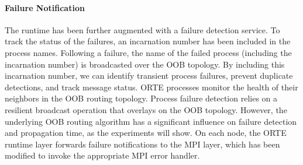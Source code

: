 \paragraph*{Failure Notification} The runtime has been further augmented with a
failure detection service. To track the status of the failures, an incarnation
number has been included in the process names. Following a failure, the name of
the failed process (including the incarnation number) is broadcasted over the
OOB topology. By including this incarnation number, we can identify transient
process failures, prevent duplicate detections, and track message status. ORTE
processes monitor the health of their neighbors in the OOB routing topology.
Process failure detection relies on a resilient broadcast operation that
overlays on the OOB topology. However, the underlying OOB routing algorithm has
a significant influence on failure detection and propagation time, as the
experiments will show. On each node, the ORTE runtime layer forwards failure
notifications to the MPI layer, which has been modified to invoke the
appropriate MPI error handler.

